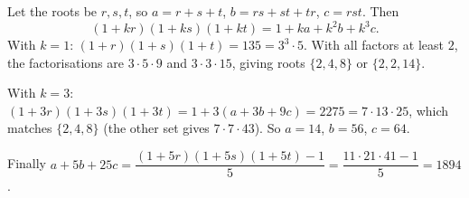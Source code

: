 Let the roots be $r,s,t$, so $a=r+s+t$, $b=rs+st+tr$, $c=rst$. Then
\[(1+kr)(1+ks)(1+kt)=1+ka+k^2b+k^3c.\]
With $k=1$: $(1+r)(1+s)(1+t)=135=3^3\cdot5$. With all factors at least $2$, the factorisations are $3\cdot5\cdot9$ and $3\cdot3\cdot15$, giving roots $\{2,4,8\}$ or $\{2,2,14\}$.

With $k=3$: $(1+3r)(1+3s)(1+3t)=1+3(a+3b+9c)=2275=7\cdot13\cdot25$, which matches $\{2,4,8\}$ (the other set gives $7\cdot7\cdot43$). So $a=14$, $b=56$, $c=64$.

Finally $a+5b+25c=\dfrac{(1+5r)(1+5s)(1+5t)-1}{5}=\dfrac{11\cdot21\cdot41-1}{5}=\boxed{1894}$.
